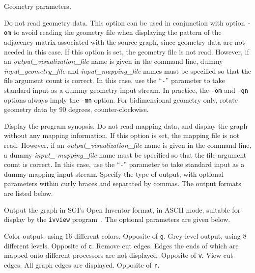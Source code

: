 \begin{itemize}
\progopt
\begin{itemize}
Geometry parameters.
\begin{itemize}
\iteme[\texttt{n}]
Do not read geometry data. This option can be used in conjunction with
option \texttt{-om} to avoid reading the geometry file when displaying
the pattern of the adjacency matrix associated with the source graph,
since geometry data are not needed in this case.
If this option is set, the geometry file is not read. However, if an
{\it output\_\lbt visualization\_\lbt file} name is given in the
command line, dummy {\it input\_\lbt geometry\_\lbt file\/} and {\it
input\_\lbt mapping\_\lbt file\/} names must be specified so that the
file argument count is correct.  In this case, use the ``\texttt{-}''
parameter to take standard input as a dummy geometry input stream.  In
practice, the \texttt{-om} and \texttt{-gn} options always imply the
\texttt{-mn} option.
\iteme[\texttt{r}]
For bidimensional geometry only, rotate geometry data by $90$ degrees,
counter-clockwise.
\end{itemize}
\iteme[\texttt{-h}]
Display the program synopsis.
\iteme[\texttt{-mn}]
Do not read mapping data, and display the graph without any mapping
information. If this option is set, the mapping file is not
read. However, if an {\it output\_\lbt visualization\_\lbt file\/}
name is given in the command line, a dummy {\it input\_\lbt
mapping\_\lbt file\/} name must be specified so that the file argument
count is correct. In this case, use the ``\texttt{-}'' parameter to take
standard input as a dummy mapping input stream.
Specify the type of output, with optional parameters within curly braces
and separated by commas. The output formats are listed below.
\begin{itemize}
\iteme[\texttt{i}]
Output the graph in SGI's {\sc Open Inventor} format, in ASCII mode,
suitable for display by the \texttt{ivview} program~\cite{oinv}. The
optional parameters are given below.
\begin{itemize}
\iteme[\texttt{c}]
Color output, using $16$ different colors. Opposite of \texttt{g}.
\iteme[\texttt{g}]
Grey-level output, using $8$ different levels. Opposite of \texttt{c}.
\iteme[\texttt{r}]
Remove cut edges. Edges the ends of which are mapped onto different
processors are not displayed. Opposite of \texttt{v}.
\iteme[\texttt{v}]
View cut edges. All graph edges are displayed.
Opposite of \texttt{r}.
\end{itemize}

\end{itemize}
\end{itemize}
\end{itemize}
